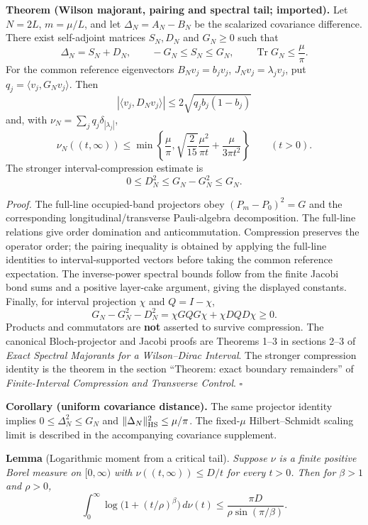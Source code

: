 \documentclass[
  10pt,
  a4paper,
]{article}
\begin{document}
\textbf{Theorem (Wilson majorant, pairing and spectral tail; imported).} Let \(N=2L\), \(m=\mu/L\), and let \(\Delta_N=A_N-B_N\) be the scalarized covariance difference. There exist self-adjoint matrices \(S_N,D_N\) and \(G_N\ge0\) such that \[
\Delta_N=S_N+D_N,\qquad -G_N\le S_N\le G_N,\qquad
\operatorname{Tr}G_N\le\frac\mu\pi.
\] For the common reference eigenvectors \(B_Nv_j=b_jv_j\), \(J_Nv_j=\lambda_jv_j\), put \(q_j=\langle v_j,G_Nv_j\rangle\). Then \[
|\langle v_j,D_Nv_j\rangle|\le2\sqrt{q_jb_j(1-b_j)}
\] and, with \(\nu_N=\sum_jq_j\delta_{|\lambda_j|}\), \[
\boxed{\nu_N((t,\infty))\le\min\left\{\frac\mu\pi,
\sqrt{\frac2{15}}\frac{\mu^2}{\pi t}+\frac\mu{3\pi t^2}\right\}\qquad(t>0).}
\] The stronger interval-compression estimate is \[
\boxed{0\le D_N^2\le G_N-G_N^2\le G_N.}
\]

\emph{Proof.} The full-line occupied-band projectors obey \((P_m-P_0)^2=G\) and the corresponding longitudinal/transverse Pauli-algebra decomposition. The full-line relations give order domination and anticommutation. Compression preserves the operator order; the pairing inequality is obtained by applying the full-line identities to interval-supported vectors before taking the common reference expectation. The inverse-power spectral bounds follow from the finite Jacobi bond sums and a positive layer-cake argument, giving the displayed constants. Finally, for interval projection \(\chi\) and \(Q=I-\chi\), \[
G_N-G_N^2-D_N^2=\chi GQG\chi+\chi DQD\chi\ge0.
\] Products and commutators are \textbf{not} asserted to survive compression. The canonical Bloch-projector and Jacobi proofs are Theorems 1--3 in sections 2--3 of \emph{Exact Spectral Majorants for a Wilson--Dirac Interval}. The stronger compression identity is the theorem in the section ``Theorem: exact boundary remainders'' of \emph{Finite-Interval Compression and Transverse Control}. \(\square\)

\textbf{Corollary (uniform covariance distance).} The same projector identity implies \(0\le\Delta_N^2\le G_N\) and \(\|\Delta_N\|_{\rm HS}^2\le\mu/\pi\). The fixed-\(\mu\) Hilbert--Schmidt scaling limit is described in the accompanying covariance supplement.

\label{lem:logtail}
\textbf{Lemma} (Logarithmic moment from a critical tail). \emph{Suppose \(\nu\) is a finite positive Borel measure on \([0,\infty)\) with \(\nu((t,\infty))\le D/t\) for every \(t>0\). Then for \(\beta>1\) and \(\rho>0\), \begin{equation}
\label{eq:logtail}
\int_0^\infty\log\bigl(1+(t/\rho)^\beta\bigr)\,d\nu(t)
\le \frac{\pi D}{\rho\sin(\pi/\beta)}.
\end{equation}}
\end{document}
